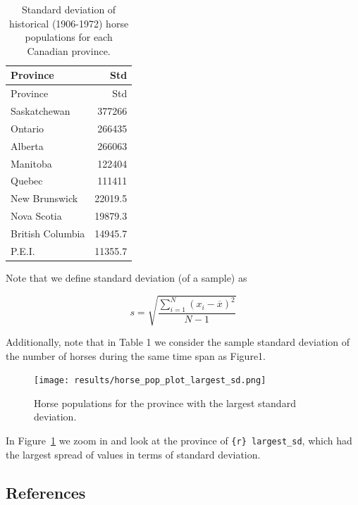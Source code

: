 \documentclass[
  letterpaper,
  DIV=11,
  numbers=noendperiod]{scrartcl}
\begin{document}
\hypertarget{tbl-horses_sd}{}
\begin{longtable}[]{@{}lr@{}}
\caption{\label{tbl-horses_sd}Standard deviation of historical
(1906-1972) horse populations for each Canadian
province.}\tabularnewline
\toprule\noalign{}
Province & Std \\
\midrule\noalign{}
\endfirsthead
\toprule\noalign{}
Province & Std \\
\midrule\noalign{}
\endhead
\bottomrule\noalign{}
\endlastfoot
Saskatchewan & 377266 \\
Ontario & 266435 \\
Alberta & 266063 \\
Manitoba & 122404 \\
Quebec & 111411 \\
New Brunswick & 22019.5 \\
Nova Scotia & 19879.3 \\
British Columbia & 14945.7 \\
P.E.I. & 11355.7 \\
\end{longtable}

Note that we define standard deviation (of a sample) as

\[s = \sqrt{\frac{\sum_{i=1}^N (x_i - \overline{x})^2}{N-1} }\]

Additionally, note that in Table 1 we consider the sample standard
deviation of the number of horses during the same time span as Figure1.

\begin{figure}

{\centering \texttt{[image: results/horse\_pop\_plot\_largest\_sd.png]}

}

\caption{\label{fig-horse_pop_plot_largest_sd}Horse populations for the
province with the largest standard deviation.}

\end{figure}

In Figure~\ref{fig-horse_pop_plot_largest_sd} we zoom in and look at the
province of \texttt{\{r\}\ largest\_sd}, which had the largest spread of
values in terms of standard deviation.

\hypertarget{references}{%
\subsection*{References}\label{references}}
\end{document}
